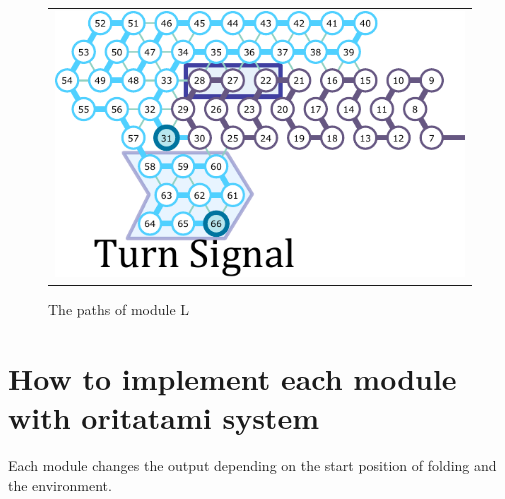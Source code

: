 \documentclass[runningheads]{llncs}
\begin{document}
\begin{figure}[tb]
\begin{tabular}{c}
  \begin{minipage}{0.5\linewidth}
  \centering
   \includegraphics[width=0.9\linewidth]{fig/svg/Ltre_1.pdf}

 \end{minipage}
 \end{tabular}
 \caption{The paths of module L}
 \label{fig:leftturns}
\end{figure}

\section{How to implement each module with oritatami system}
Each module changes the output depending on the start position of folding and the environment.
\end{document}
